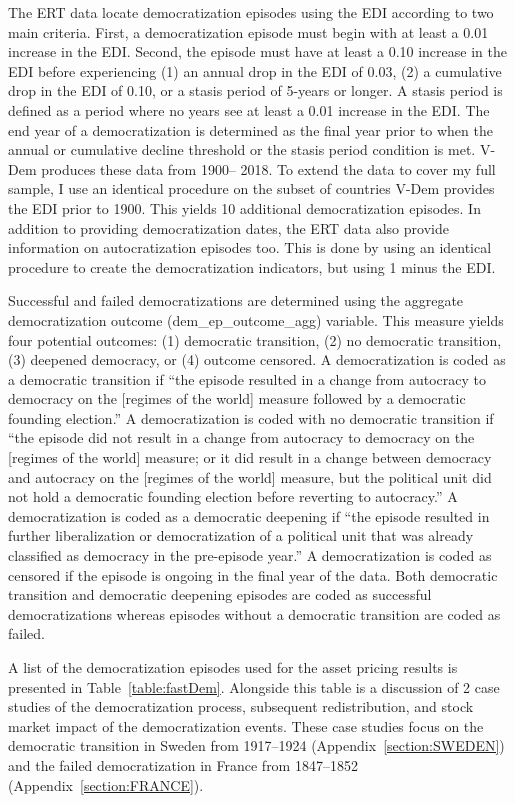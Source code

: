 The ERT data locate democratization episodes using the EDI according to two main criteria. First, a democratization episode must begin with at least a 0.01 increase in the EDI. Second, the episode must have at least a 0.10 increase in the EDI before experiencing (1) an annual drop in the EDI of 0.03, (2) a cumulative drop in the EDI of 0.10, or a stasis period of 5-years or longer. A stasis period is defined as a period where no years see at least a 0.01 increase in the EDI.  The end year of a democratization is determined as the final year prior to when the annual or cumulative decline threshold or the stasis period condition is met.  V-Dem produces these data from 1900-- 2018. To extend the data to cover my full sample, I use an identical procedure on the subset of countries V-Dem provides the EDI prior to 1900. This yields 10 additional democratization episodes.  In addition to providing democratization dates, the ERT data also provide information on autocratization episodes too. This is done by using an identical procedure to create the democratization indicators, but using 1 minus the EDI. 

Successful and failed democratizations are determined using the aggregate democratization outcome (dem\_ep\_outcome\_agg) variable.  This measure yields four potential outcomes: (1) democratic transition, (2) no democratic transition, (3) deepened democracy, or (4) outcome censored. A democratization is coded as a democratic transition if ``the episode resulted in a change from autocracy to democracy on the [regimes of the world] measure followed by a democratic founding election.'' A democratization is coded with no democratic transition if ``the episode did not result in a change from autocracy to democracy on the [regimes of the world] measure; or it did result in a change between democracy and autocracy on the [regimes of the world] measure, but the political unit did not hold a democratic founding election before reverting to autocracy.'' A democratization is coded as a democratic deepening if ``the episode resulted in further liberalization or democratization of a political unit that was already classified as democracy in the pre-episode year.'' A democratization is coded as censored if the episode is ongoing in the final year of the data.  Both democratic transition and democratic deepening episodes are coded as successful democratizations whereas episodes without a democratic transition are coded as failed.

A list of the democratization episodes used for the asset pricing results is presented in Table~\ref{table:fastDem}. Alongside this table is a discussion of 2 case studies of the democratization process, subsequent redistribution, and stock market impact of the democratization events. These case studies focus on the democratic transition in Sweden from 1917--1924 (Appendix~\ref{section:SWEDEN}) and the failed democratization in France from 1847--1852 (Appendix~\ref{section:FRANCE}).

